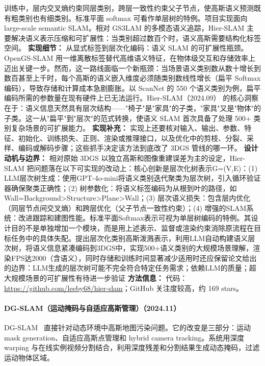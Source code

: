 训练中，层内交叉熵约束同层类别，跨层一致性约束父子节点，使高斯语义预测既有粗类别也有细类别。标准平面 softmax 可看作单层树的特例。项目实现面向 large-scale semantic SLAM。相对 GS3LAM 的多模态语义追踪，Hier-SLAM 主要解决语义表示压缩和可扩展性：当类别超过数百个时，语义高斯需要结构化标签空间。
\textbf{实现细节：} 从显式标签到层次化编码：语义 SLAM 的可扩展性瓶颈。OpenGS-SLAM 用一维离散标签替代高维语义特征，在物体级交互和存储效率上迈出关键一步。然而，这一路线面临一个新瓶颈：当场景语义类别数从数十增长到数百甚至上千时，每个高斯的语义嵌入维度必须随类别数线性增长（扁平 Softmax 编码），导致存储和计算成本急剧膨胀。以 ScanNet 的 550 个语义类别为例，扁平编码所需的参数量在现有硬件上已无法运行。Hier-SLAM（2024.09） 的核心洞察在于：语义信息天然具有层次结构——"椅子"是"家具"的子类，"家具"又是"物体"的子类。这一从"扁平"到"层次"的范式转换，使语义 SLAM 首次具备了处理 500+ 类别复杂场景的可扩展能力。
\textbf{实现补充：} 实现上还要核对输入、输出、参数、特征、初始化、训练损失、正则、渲染或推理接口，以及优化中的剪枝、分裂、采样、编码或解码步骤；这些抓手决定该方法到底改了 3DGS 管线的哪一环。
\textbf{设计动机与边界：} 相对原始 3DGS 以独立高斯和图像重建误差为主的设定，Hier-SLAM 把问题落在以下可实现的改动上：核心创新是层次化树表示G=(V,E)：(1) LLM层次树生成：使用GPT-4o-mini将语义类别迭代聚类为层次树，引入循环验证器确保聚类正确性；(2) 树参数化：将语义标签编码为从根到叶的路径，如Wall=Background>Structure>Plane>Wall；(3) 层次语义损失：包含层内优化（同层节点间交叉熵）和跨层优化（父子节点一致性约束）；(4) 增强的SLAM系统：改进跟踪和建图性能。标准平面Softmax表示可视为单层树编码的特例。其设计目的不是单独增加一个模块，而是用上述表示、监督或渲染约束消除原流程在目标任务中的具体失配。提出层次化类别高斯泼溅表示，利用LLM自动构建语义层次树，将语义信息紧凑编码到3DGS中，实现500+语义类别的大规模场景理解，渲染FPS达2000（含语义），同时存储和训练时间显著减少适用时还应保留论文给出的边界：LLM生成的层次树可能不完全符合特定任务需求；依赖LLM的质量；超大规模场景的可扩展性有待进一步验证
\textbf{方法信息：} 代码：\url{https://github.com/leeby68/hier-slam}；GitHub 关注度较高，约 169 stars。



\paragraph{DG-SLAM（运动掩码与自适应高斯管理）（2024.11）}
DG-SLAM~\cite{2411_08373} 直接针对动态环境中高斯地图污染问题。它的改变是三部分：运动 mask generation、自适应高斯点管理和 hybrid camera tracking。系统用深度 warping 与在线实例视频分割结合，利用深度残差和分割结果生成动态掩码，过滤运动物体区域。

